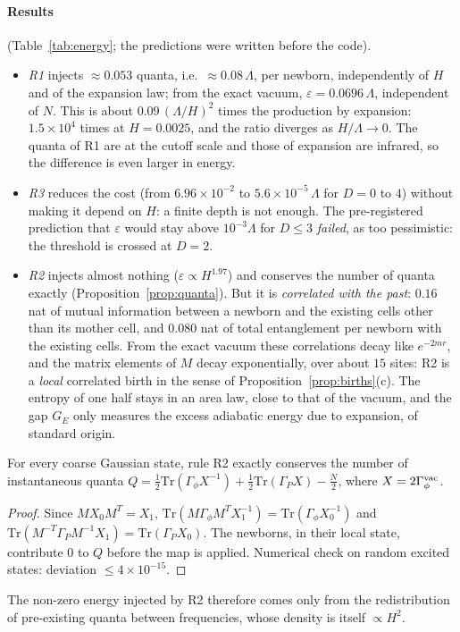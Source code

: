 \paragraph{Results} (Table~\ref{tab:energy}; the predictions were written before the code).
\begin{itemize}[leftmargin=*,itemsep=1pt]
\item \emph{R1} injects $\approx0.053$ quanta, i.e.\ $\approx0.08\,\Lambda$, per newborn, independently of $H$ and of the expansion law; from the exact vacuum, $\varepsilon=0.0696\,\Lambda$, independent of $N$. This is about $0.09\,(\Lambda/H)^2$ times the production by expansion: $1.5\times10^4$ times at $H=0.0025$, and the ratio diverges as $H/\Lambda\to0$. The quanta of R1 are at the cutoff scale and those of expansion are infrared, so the difference is even larger in energy.
\item \emph{R3} reduces the cost (from $6.96\times10^{-2}$ to $5.6\times10^{-5}\,\Lambda$ for $D=0$ to $4$) without making it depend on $H$: a finite depth is not enough. The pre-registered prediction that $\varepsilon$ would stay above $10^{-3}\Lambda$ for $D\le3$ \emph{failed}, as too pessimistic: the threshold is crossed at $D=2$.
\item \emph{R2} injects almost nothing ($\varepsilon\propto H^{1.97}$) and conserves the number of quanta exactly (Proposition~\ref{prop:quanta}). But it is \emph{correlated with the past}: $0.16$ nat of mutual information between a newborn and the existing cells other than its mother cell, and $0.080$ nat of total entanglement per newborn with the existing cells. From the exact vacuum these correlations decay like $e^{-2mr}$, and the matrix elements of $M$ decay exponentially, over about $15$ sites: R2 is a \emph{local} correlated birth in the sense of Proposition~\ref{prop:births}(c). The entropy of one half stays in an area law, close to that of the vacuum, and the gap $G_E$ only measures the excess adiabatic energy due to expansion, of standard origin.
\end{itemize}

\begin{proposition}\label{prop:quanta}
For every coarse Gaussian state, rule R2 exactly conserves the number of instantaneous quanta $Q=\frac12\mathrm{Tr}(\Gamma_\phi X^{-1})+\frac12\mathrm{Tr}(\Gamma_P X)-\frac N2$, where $X=2\Gamma_\phi^{\rm vac}$.
\end{proposition}
\begin{proof}
Since $MX_0M^{T}=X_1$, $\mathrm{Tr}(M\Gamma_\phi M^TX_1^{-1})=\mathrm{Tr}(\Gamma_\phi X_0^{-1})$ and $\mathrm{Tr}(M^{-T}\Gamma_PM^{-1}X_1)=\mathrm{Tr}(\Gamma_PX_0)$. The newborns, in their local state, contribute $0$ to $Q$ before the map is applied. Numerical check on random excited states: deviation $\le4\times10^{-15}$.
\end{proof}
The non-zero energy injected by R2 therefore comes only from the redistribution of pre-existing quanta between frequencies, whose density is itself $\propto H^2$.

